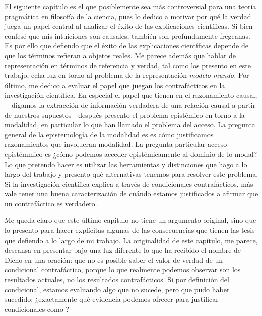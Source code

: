 El siguiente capítulo es el que posiblemente sea más
controversial para una teoría pragmática en filosofía de la
ciencia, pues lo dedico a motivar por qué la verdad juega un
papel central al analizar el éxito de las explicaciones
científicas. Si bien confesé que mis intuiciones son
causales, también son profundamente fregeanas. Es por ello
que defiendo que el éxito de las explicaciones científicas
depende de que los términos refieran a objetos reales. Me
parece además que hablar de representación en términos de
referencia y verdad, tal como los presento en este trabajo,
echa luz en torno al problema de la representación
\emph{modelo-mundo.} Por último, me dedico a evaluar el papel que juegan los
contrafácticos en la investigación científica. En especial
el papel que tienen en el razonamiento causal,---digamos la
extracción de información verdadera de una relación causal a partir de nuestros
supuestos---después presento el problema epistémico en
torno a la modalidad, en particular lo que  han llamado el
problema del acceso. La pregunta general de la epistemología
de la modalidad es es cómo justificamos razonamientos que involucran
modalidad. La pregunta particular acceso
epistémmico es ¿cómo podemos acceder epistémicamente al
dominio de lo modal? \parencite{Vaidya2018} Lo que pretendo hacer es utilizar las
herramientas y distinciones que hago a lo largo del trabajo
y presento qué alternativas tenemos para resolver este
problema. Si la investigación científica explica a través de
condicionales contrafácticos, más vale tener una buena
caracterización de cuándo estamos justificados a afirmar que
un contrafáctico es verdadero.

Me queda claro que este
último capítulo no tiene un argumento original, sino que lo
presento para hacer explícitas algunas de las consecuencias
que tienen las tesis que defiendo a lo largo de mi trabajo.
La originalidad de este capítulo, me parece, descansa en
presentar bajo una luz diferente lo que ha recibido el nombre de 
\parencite{Holland, llaudet2023, Otsuka2023} Dicho en una
oración: que no es posible saber el valor de verdad de un
condicional contrafáctico, porque lo que realmente podemos
observar son los resultados actuales, no los resultados
contrafácticos. Si por definición del condicional, estamos
evaluando algo que no sucede, pero que pudo haber sucedido:
¿exactamente qué evidencia podemos ofrecer para justificar
condicionales como ? 

